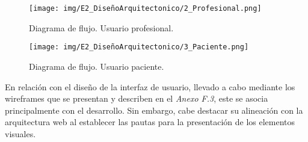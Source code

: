\begin{figure}[h]
    \centering
    \texttt{[image: img/E2\_DiseñoArquitectonico/2\_Profesional.png]}
    \caption{Diagrama de flujo. Usuario profesional.}
    \label{fig:2_Profesional}
\end{figure}

\begin{figure}[h]
    \centering
    \texttt{[image: img/E2\_DiseñoArquitectonico/3\_Paciente.png]}
    \caption{Diagrama de flujo. Usuario paciente.}
    \label{fig:3_Paciente}
\end{figure}


En relación con el diseño de la interfaz de usuario, llevado a cabo mediante los wireframes que se presentan y describen en el \textit{Anexo F.3}, este se asocia principalmente con el desarrollo. Sin embargo, cabe destacar su alineación con la arquitectura web al establecer las pautas para la presentación de los elementos visuales.
